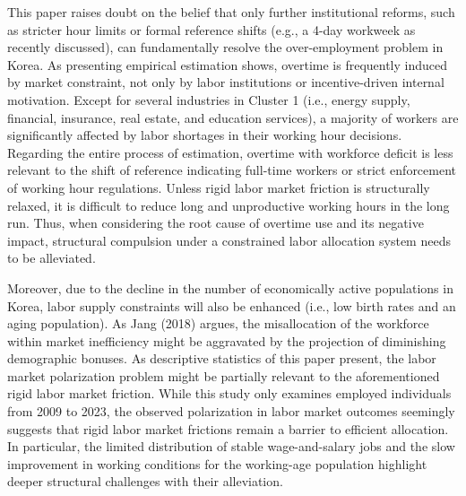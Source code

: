 \documentclass[
  12pt,
]{article}
\begin{document}
This paper raises doubt on the belief that only further institutional
reforms, such as stricter hour limits or formal reference shifts (e.g.,
a 4-day workweek as recently discussed), can fundamentally resolve the
over-employment problem in Korea. As presenting empirical estimation
shows, overtime is frequently induced by market constraint, not only by
labor institutions or incentive-driven internal motivation. Except for
several industries in Cluster 1 (i.e., energy supply, financial,
insurance, real estate, and education services), a majority of workers
are significantly affected by labor shortages in their working hour
decisions. Regarding the entire process of estimation, overtime with
workforce deficit is less relevant to the shift of reference indicating
full-time workers or strict enforcement of working hour regulations.
Unless rigid labor market friction is structurally relaxed, it is
difficult to reduce long and unproductive working hours in the long run.
Thus, when considering the root cause of overtime use and its negative
impact, structural compulsion under a constrained labor allocation
system needs to be alleviated.

Moreover, due to the decline in the number of economically active
populations in Korea, labor supply constraints will also be enhanced
(i.e., low birth rates and an aging population). As Jang (2018) argues,
the misallocation of the workforce within market inefficiency might be
aggravated by the projection of diminishing demographic bonuses. As
descriptive statistics of this paper present, the labor market
polarization problem might be partially relevant to the aforementioned
rigid labor market friction. While this study only examines employed
individuals from 2009 to 2023, the observed polarization in labor market
outcomes seemingly suggests that rigid labor market frictions remain a
barrier to efficient allocation. In particular, the limited distribution
of stable wage-and-salary jobs and the slow improvement in working
conditions for the working-age population highlight deeper structural
challenges with their alleviation.
\end{document}
